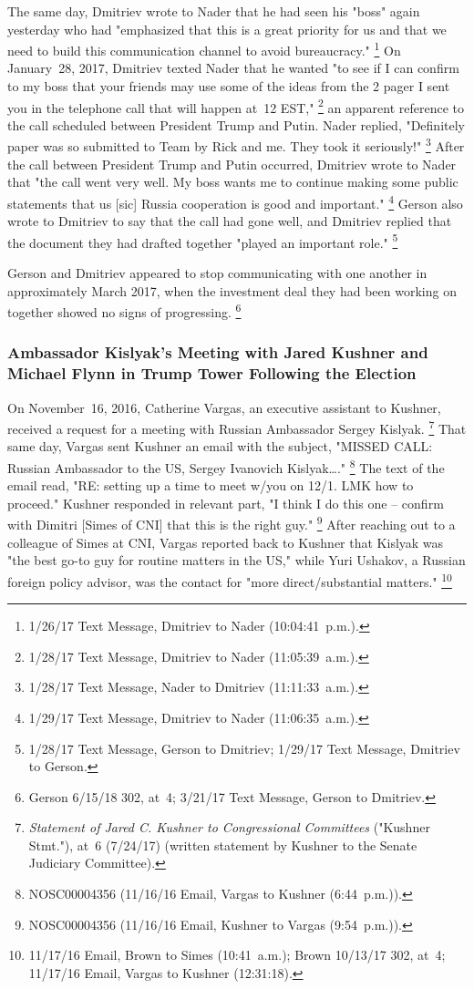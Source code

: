 The same day, Dmitriev wrote to Nader that he had seen his "boss" again yesterday who had "emphasized that this is a great priority for us and that we need to build this communication channel to avoid bureaucracy."%
\footnote{1/26/17 Text Message, Dmitriev to Nader (10:04:41~p.m.).}
On January~28, 2017, Dmitriev texted Nader that he wanted "to see if I can confirm to my boss that your friends may use some of the ideas from the 2 pager I sent you in the telephone call that will happen at~12 EST,"%
\footnote{1/28/17 Text Message, Dmitriev to Nader (11:05:39~a.m.).}
an apparent reference to the call scheduled between President Trump and Putin.
Nader replied, "Definitely paper was so submitted to Team by Rick and me.
They took it seriously!"%
\footnote{1/28/17 Text Message, Nader to Dmitriev (11:11:33~a.m.).}
After the call between President Trump and Putin occurred, Dmitriev wrote to Nader that "the call went very well.
My boss wants me to continue making some public statements that us [sic] Russia cooperation is good and important."%
\footnote{1/29/17 Text Message, Dmitriev to Nader (11:06:35~a.m.).}
Gerson also wrote to Dmitriev to say that the call had gone well, and Dmitriev replied that the document they had drafted together "played an important role."%
\footnote{1/28/17 Text Message, Gerson to Dmitriev;
1/29/17 Text Message, Dmitriev to Gerson.}

Gerson and Dmitriev appeared to stop communicating with one another in approximately March 2017, when the investment deal they had been working on together showed no signs of progressing.%
\footnote{Gerson 6/15/18 302, at~4;
3/21/17 Text Message, Gerson to Dmitriev.}

\subsubsection{Ambassador Kislyak's Meeting with Jared Kushner and Michael Flynn in Trump Tower Following the Election}

On November~16, 2016, Catherine Vargas, an executive assistant to Kushner, received a request for a meeting with Russian Ambassador Sergey Kislyak.%
\footnote{\textit{Statement of Jared C. Kushner to Congressional Committees} ("Kushner Stmt."), at~6 (7/24/17) (written statement by Kushner to the Senate Judiciary Committee).}
That same day, Vargas sent Kushner an email with the subject, "MISSED CALL: Russian Ambassador to the US, Sergey Ivanovich Kislyak\dots."%
\footnote{NOSC00004356 (11/16/16 Email, Vargas to Kushner (6:44~p.m.)).}
The text of the email read, "RE: setting up a time to meet w/you on 12/1. LMK how to proceed."
Kushner responded in relevant part, "I think I do this one -- confirm with Dimitri [Simes of CNI] that this is the right guy."%
\footnote{NOSC00004356 (11/16/16 Email, Kushner to Vargas (9:54~p.m.)).}
After reaching out to a colleague of Simes at CNI, Vargas reported back to Kushner that Kislyak was "the best go-to guy for routine matters in the US," while Yuri Ushakov, a Russian foreign policy advisor, was the contact for "more direct/substantial matters."%
\footnote{11/17/16 Email, Brown to Simes (10:41~a.m.);
Brown 10/13/17 302, at~4;
11/17/16 Email, Vargas to Kushner (12:31:18).}

